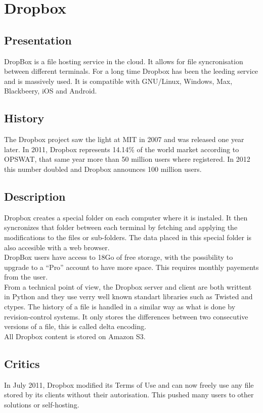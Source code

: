 \section{Dropbox}
\thispagestyle{EIP} %
\subsection{Presentation}
DropBox is a file hosting service in the cloud. It allows for file syncronisation between different terminals. For a long time Dropbox has been the leeding service and is massively used. It is compatible with GNU/Linux, Windows, Max, Blackbeery, iOS and Android.\\

\subsection{History}
The Dropbox project saw the light at MIT in 2007 and was released one year later. In 2011, Dropbox represents 14.14\% of the world market according to OPSWAT, that same year more than 50 million users where registered. In 2012 this number doubled and Dropbox announces 100 million users.\\

\subsection{Description}
Dropbox creates a special folder on each computer where it is instaled. It then syncronizes that folder between each terminal by fetching and applying the modifications to the files or sub-folders. The data placed in this special folder is also accesible with a web browser.\\

DropBox users have access to 18Go of free storage, with the possibility to upgrade to a ``Pro'' account to have more space. This requires monthly payements from the user.\\

From a technical point of view, the Dropbox server and client are both writtent in Python and they use verry well known standart libraries such as Twisted and ctypes. The history of a file is handled in a similar way as what is done by revision-control systems. It only stores the differences between two consecutive versions of a file, this is called delta encoding.\\

All Dropbox content is stored on Amazon S3.

\subsection{Critics}

In July 2011, Dropbox modified its Terms of Use and can now freely use any file stored by its clients without their autorisation. This pushed many users to other solutions or self-hosting.\\
